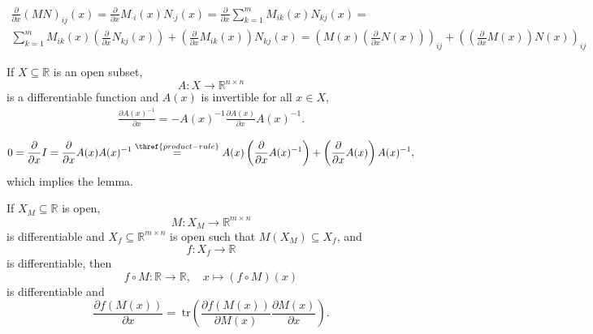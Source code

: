 \documentclass[a4paper,11pt]{report}
\newcommand{\tr}{\;\text{tr}}
\begin{document}
\begin{appendix}
\begin{Bew}
\begin{align*}
\frac{\partial}{\partial x}(MN)_{ij}(x)=
\frac{\partial}{\partial x}M_{\cdot i}(x)N_{\cdot j}(x)=
\frac{\partial}{\partial x}\sum_{k=1}^mM_{ik}(x)N_{kj}(x)=\\
\sum_{k=1}^m
M_{ik}(x)\left(\frac{\partial}{\partial x}N_{kj}(x)\right)+
\left(\frac{\partial}{\partial x}M_{ik}(x)\right)N_{kj}(x)=
\left(M(x)\left(\frac{\partial}{\partial x}N(x)\right)\right)_{ij}+
\left(\left(\frac{\partial}{\partial x}M(x)\right)N(x)\right)_{ij}
\end{align*}
\end{Bew}

\begin{Lem}\label{inverse-chain}
If $X\subseteq\mathbb{R}$ is an open subset,
\[
A:X\to\mathbb{R}^{n\times n}
\]
is a differentiable function and $A(x)$ is invertible for all $x\in X$, 
\begin{align*}
\frac{\partial A(x)^{-1}}{\partial x}=-A(x)^{-1}\frac{\partial A(x)}{\partial x}A(x)^{-1}.
\end{align*}
\end{Lem}

\begin{Bew}
\begin{align*}
0=\frac{\partial}{\partial x}I=
\frac{\partial}{\partial x}A(x)A(x)^{-1}\overset{\thref{product-rule}}{=}
A(x)\left(\frac{\partial}{\partial x}A(x)^{-1}\right)+
\left(\frac{\partial}{\partial x}A(x)\right)A(x)^{-1},
\end{align*}
which implies the lemma.
\end{Bew}

\begin{Lem}\label{chain-rule}
If $X_M\subseteq\mathbb{R}$ is open, 
\[
M:X_M\to\mathbb{R}^{m\times n}
\]
is differentiable and $X_f\subseteq\mathbb{R}^{m\times n}$ is open such that $M(X_M)\subseteq X_f$, and
\[
f:X_f\to\mathbb{R}
\]
is differentiable, then
\[
f\circ M:\mathbb{R}\to\mathbb{R},
\quad
x\mapsto (f\circ M)(x)
\]
is differentiable and
\[
\frac{\partial f\left(M(x)\right)}{\partial x}=
\tr\left(\frac{\partial f\left(M(x)\right)}{\partial M(x)}\frac{\partial M(x)}{\partial x}\right).
\]
\end{Lem}


\end{appendix}
\end{document}
